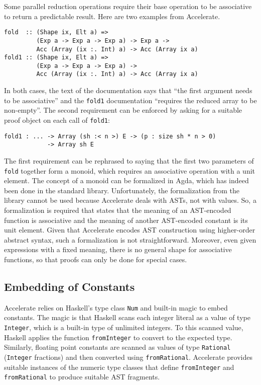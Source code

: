 \documentclass{llncs}
\begin{document}
Some parallel reduction operations require their base operation to be
associative to return a predictable result. Here are two examples from
Accelerate. 
\begin{verbatim}
fold  :: (Shape ix, Elt a) =>
         (Exp a -> Exp a -> Exp a) -> Exp a ->
         Acc (Array (ix :. Int) a) -> Acc (Array ix a)
fold1 :: (Shape ix, Elt a) =>
         (Exp a -> Exp a -> Exp a) ->
         Acc (Array (ix :. Int) a) -> Acc (Array ix a)
\end{verbatim}
In both cases, the text of the documentation says that ``the first
argument needs to be associative'' and the \texttt{fold1}
documentation ``requires the reduced array to be non-empty''.
The second requirement can be enforced by asking for a suitable proof
object on each call of \texttt{fold1}:
\begin{verbatim}
fold1 : ... -> Array (sh :< n >) E -> (p : size sh * n > 0)
            -> Array sh E
\end{verbatim}
The first requirement can be rephrased to saying that the first two
parameters of \texttt{fold} together form a monoid, which requires an
associative operation with a unit element. The concept of a monoid
can be formalized in Agda, which has indeed been done in the standard
library. Unfortunately, the formalization from the library cannot be
used because Accelerate deals with ASTs, not with values. So, a
formalization is required that states that the meaning of an
AST-encoded function is associative and the meaning of another
AST-encoded constant is its unit element. Given that Accelerate
encodes AST construction using higher-order abstract syntax, such a
formalization is not straightforward. Moreover, even given expressions
with a fixed meaning, there is no general shape for associative
functions, so that proofs can only be done for special cases. 

\subsection{Embedding of Constants}
\label{sec:embedding-constants}

Accelerate relies on Haskell's type class \texttt{Num} and built-in
magic to embed constants. The magic is that Haskell scans each integer
literal as a value of type \texttt{Integer}, which is a built-in type
of unlimited integers. To this scanned value, Haskell applies the
function \texttt{fromInteger} to convert to the expected
type. Similarly, floating point constants are scanned as values of
type \texttt{Rational} (\texttt{Integer} fractions) and then converted
using \texttt{fromRational}. Accelerate provides suitable instances of
the numeric type classes that define \texttt{fromInteger} and
\texttt{fromRational} to produce suitable AST fragments.
\end{document}
